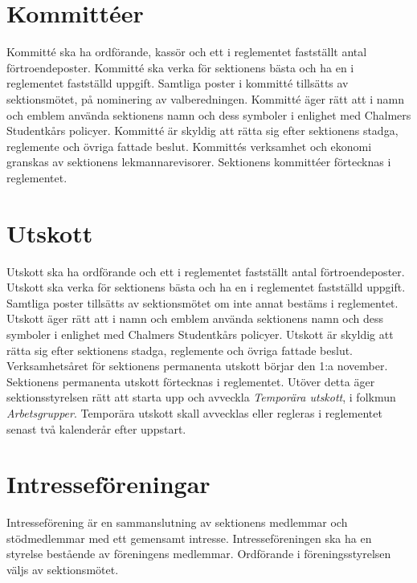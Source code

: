 \documentclass[a4paper]{dteklag}
\begin{document}
\section{Kommittéer}
\para Kommitté ska ha ordförande, kassör och ett i reglementet fastställt antal förtroendeposter.
\para Kommitté ska verka för sektionens bästa och ha en i reglementet fastställd uppgift.
\para Samtliga poster i kommitté tillsätts av sektionsmötet, på nominering av valberedningen.
\para Kommitté äger rätt att i namn och emblem använda sektionens namn och dess symboler i enlighet med Chalmers Studentkårs policyer.
\para Kommitté är skyldig att rätta sig efter sektionens stadga, reglemente och övriga fattade beslut.
\para Kommittés verksamhet och ekonomi granskas av sektionens lekmannarevisorer.
\para Sektionens kommittéer förtecknas i reglementet.

\section{Utskott}
\para Utskott ska ha ordförande och ett i reglementet fastställt antal förtroendeposter.
\para Utskott ska verka för sektionens bästa och ha en i reglementet fastställd uppgift.
\para Samtliga poster tillsätts av sektionsmötet om inte annat bestäms i reglementet. 
\para Utskott äger rätt att i namn och emblem använda sektionens namn och dess symboler i enlighet med Chalmers Studentkårs policyer.
\para Utskott är skyldig att rätta sig efter sektionens stadga, reglemente och övriga fattade beslut.
\para Verksamhetsåret för sektionens permanenta utskott börjar den 1:a november.
\para Sektionens permanenta utskott förtecknas i reglementet.
 Utöver detta äger sektionsstyrelsen rätt att starta upp och avveckla \textit{Temporära utskott}, i folkmun \textit{Arbetsgrupper}.
\para Temporära utskott skall avvecklas eller regleras i reglementet senast två kalenderår efter uppstart.


\section{Intresseföreningar}
\para[Definition]
Intresseförening är en sammanslutning av sektionens medlemmar och stödmedlemmar med ett gemensamt intresse. Intresseföreningen ska ha en styrelse bestående av föreningens medlemmar. Ordförande i föreningsstyrelsen väljs av sektionsmötet.
\end{document}
